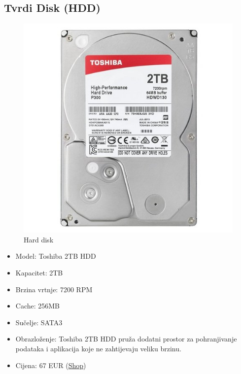\documentclass{article}
\begin{document}
\subsection{Tvrdi Disk (HDD)}
\begin{figure}[H]
    \centering
    \includegraphics[width = \textwidth]{Slike/HDD.jpg}
    \caption{Hard disk}
    \label{fig:HDD}
\end{figure}
\begin{itemize}
    \item Model: Toshiba 2TB HDD
    \item Kapacitet: 2TB
    \item Brzina vrtnje: 7200 RPM
    \item Cache: 256MB
    \item Sučelje: SATA3
    \item Obrazloženje: Toshiba 2TB HDD pruža dodatni prostor za pohranjivanje podataka i aplikacija koje ne zahtijevaju veliku brzinu.
    \item Cijena: 67 EUR (\href{https://www.adm.hr/toshiba-2tb-35-7200rpm-256mb-p300-hdwd320uzsva/76518/product/?utm_source=nabava.net&utm_campaign=nabava.net&utm_medium=click}{Shop})
\end{itemize}
\pagebreak
\end{document}
